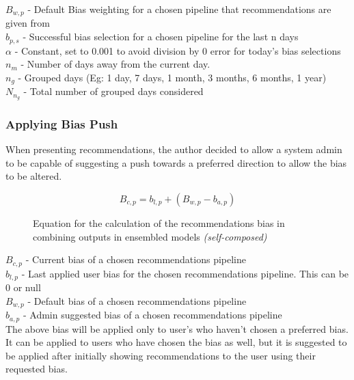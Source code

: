 \noindent $B_{w,p}$ - Default Bias weighting for a chosen pipeline that recommendations are given from\\
$b_{p,s}$ - Successful bias selection for a chosen pipeline for the last n days\\
$\alpha$ - Constant, set to 0.001 to avoid division by 0 error for today's bias selections\\
$n_{m}$ - Number of days away from the current day.\\
$n_{g}$ - Grouped days (Eg: 1 day, 7 days, 1 month, 3 months, 6 months, 1 year)\\
$N_{n_{g}}$ - Total number of grouped days considered




\subsubsection{Applying Bias Push}

When presenting recommendations, the author decided to allow a system admin to be capable of suggesting a push towards a preferred direction to allow the bias to be altered.

\begin{figure}[h!]
\begin{equation}
B_{c,p} = b_{l,p} + \left( B_{w,p} - b_{a,p} \right)
\end{equation}
\caption*{Equation for the calculation of the recommendations bias in combining outputs in ensembled models \textit{(self-composed)}}
\end{figure}

\noindent$B_{c,p}$ - Current bias of a chosen recommendations pipeline\\
$b_{l,p}$ - Last applied user bias for the chosen recommendations pipeline. This can be 0 or null\\
$B_{w,p}$ - Default bias of a chosen recommendations pipeline\\
$b_{a,p}$ - Admin suggested bias of a chosen recommendations pipeline\\

The above bias will be applied only to user's who haven't chosen a preferred bias. It can be applied to users who have chosen the bias as well, but it is suggested to be applied after initially showing recommendations to the user using their requested bias.


